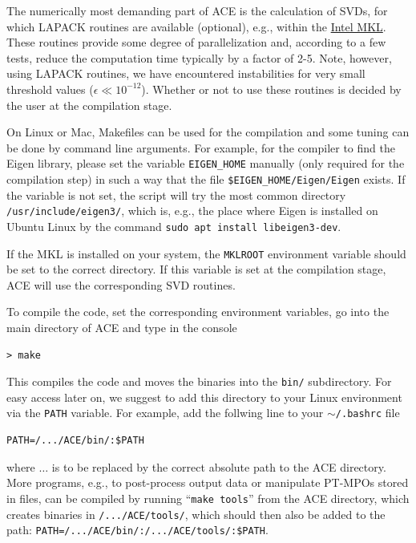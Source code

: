 \documentclass{scrartcl}
\begin{document}
The numerically most demanding part of ACE is the calculation of SVDs, 
for which LAPACK routines are available (optional), e.g., within the
\href{https://software.intel.com/content/www/us/en/develop/tools/math-kernel-library.html}{Intel MKL}.
These routines provide 
some degree of parallelization and, according to a few tests, reduce the 
computation time typically by a factor of 2-5. Note, however, using LAPACK
routines, we have encountered instabilities for very small threshold values 
($\epsilon \ll 10^{-12}$). 
Whether or not to use these routines is decided by the user at the compilation
stage.

On Linux or Mac, Makefiles can be used for the compilation and some tuning
can be done by command line arguments. For example, for the compiler to find
the Eigen library, please set the variable 
\texttt{EIGEN\_HOME} manually (only required for the compilation step)
in such a way that the file \texttt{\$EIGEN\_HOME/Eigen/Eigen} exists.
If the variable is not set, the script will try the most common directory
\texttt{/usr/include/eigen3/}, which is, e.g., the place where Eigen is 
installed on Ubuntu Linux by the command \texttt{sudo apt install libeigen3-dev}.

If the MKL is installed on your system, the \texttt{MKLROOT} 
environment variable should be set to the correct directory.
If this variable is set at the compilation stage, 
ACE will use the corresponding SVD routines.


To compile the code, set the corresponding environment variables, 
go into the main directory of ACE and type in the
console
\begin{verbatim}
> make 
\end{verbatim}
This compiles the code and moves the binaries into the \texttt{bin/}
subdirectory. For easy access later on, we suggest to add this directory
to your Linux environment via the \texttt{PATH} variable. For example, 
add the follwing line to your \texttt{$\sim$/.bashrc} file 
\begin{verbatim}
PATH=/.../ACE/bin/:$PATH 
\end{verbatim}
where $\dots$ is to be replaced by the correct absolute path to the ACE 
directory. More programs, e.g., to post-process output data or manipulate
PT-MPOs stored in files, can be compiled by running ``\verb#make tools#'' 
from the ACE
directory, which creates binaries in \verb#/.../ACE/tools/#, which should then
also be added to the path: \verb#PATH=/.../ACE/bin/:/.../ACE/tools/:$PATH#.
\end{document}
